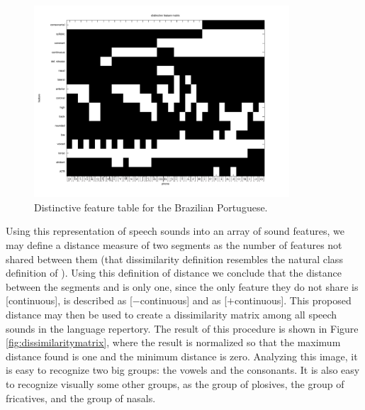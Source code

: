 \begin{figure}[h!]
\centering
\includegraphics[width=0.85\textwidth]{images/distinctivefeature_PT_matrix.pdf}
\caption{Distinctive feature table for the Brazilian Portuguese.}
\label{fig:distinctivefeaturetable}
\end{figure}

Using this representation of speech sounds into an array of sound features, we may define a distance measure of two segments as the number of features not shared between them (that dissimilarity definition resembles the natural class definition of \cite{flemming2005}). Using this definition of distance we conclude that the distance between the segments \textipa{[k]} and \textipa{[h]} is only one, since the only feature they do not share is [continuous], \textipa{[k]} is described as [$-$continuous] and \textipa{[h]} as [$+$continuous]. This proposed distance may then be used to create a dissimilarity matrix among all speech sounds in the language repertory. The result of this procedure is shown in Figure \ref{fig:dissimilaritymatrix}, where the result is normalized so that the maximum distance found is one and the minimum distance is zero. Analyzing this image, it is easy to recognize two big groups: the vowels and the consonants. It is also easy to recognize visually some other groups, as the group of plosives, the group of fricatives, and the group of nasals.


